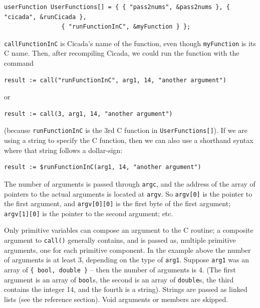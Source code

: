 \documentclass{article}
\newenvironment{code}{
       \begin{list}{}{
               \setlength{\leftmargin}{.4in}
               \setlength{\rightmargin}{0in}
               \setlength{\topsep}{.2in}
       }
       \small
       \item[] }
       { \end{list}   }
\begin{document}
\begin{code} \begin{verbatim}
userFunction UserFunctions[] = { { "pass2nums", &pass2nums }, { "cicada", &runCicada },
                { "runFunctionInC", &myFunction } };
\end{verbatim} \end{code}

\noindent \verb#callFunctionInC# is Cicada's name of the function, even though \verb#myFunction# is its C name.  Then, after recompiling Cicada, we could run the function with the command

\begin{code} \begin{verbatim}
result := call("runFunctionInC", arg1, 14, "another argument")
\end{verbatim} \end{code}

\noindent or

\begin{code} \begin{verbatim}
result := call(3, arg1, 14, "another argument")
\end{verbatim} \end{code}

\noindent (because \verb#runFunctionInC# is the 3rd C function in \verb#UserFunctions[]#).  If we are using a string to specify the C function, then we can also use a shorthand syntax where that string follows a dollar-sign:

\begin{code} \begin{verbatim}
result := $runFunctionInC(arg1, 14, "another argument")
\end{verbatim} \end{code}

The number of arguments is passed through \texttt{argc}, and the address of the array of pointers to the actual arguments is located at \texttt{argv}.  So \texttt{argv[0]} is the pointer to the first argument, and \texttt{argv[0][0]} is the first byte of the first argument; \texttt{argv[1][0]} is the pointer to the second argument; etc.

Only primitive variables can compose an argument to the C routine; a composite argument to \texttt{call()} generally contains, and is passed as, multiple primitive arguments, one for each primitive component.  In the example above the number of arguments is at least 3, depending on the type of \verb#arg1#.  Suppose \verb#arg1# was an array of \verb#{ bool, double }# -- then the number of arguments is 4.  (The first argument is an array of \verb#bool#s, the second is an array of \verb#double#s, the third contains the integer 14, and the fourth is a string).  Strings are passed as linked lists (see the reference section).  Void arguments or members are skipped.
\end{document}
